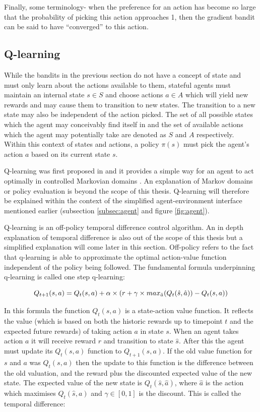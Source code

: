 Finally, some terminology- when the preference for an action has become so large that the probability of picking this action approaches 1, then the gradient bandit can be said to have “converged” to this action. 

\subsection{Q-learning}

While the bandits in the previous section do not have a concept of state and must only learn about the actions available to them, stateful agents must maintain an internal state $s \in S$ and choose actions $a \in A$ which will yield new rewards and may cause them to transition to new states. The transition to a new state may also be independent of the action picked. The set of all possible states which the agent may conceivably find itself in and the set of available actions which the agent may potentially take are denoted as $S$ and $A$ respectively. Within this context of states and actions, a policy $\pi(s)$ must pick the agent’s action $a$ based on its current state $s$.

Q-learning was first proposed in \cite{watkins_dayan} and it provides a simple way for an agent to act optimally in controlled Markovian domains \cite{watkins_dayan}. An explanation of Markov domains or policy evaluation is beyond the scope of this thesis. Q-learning will therefore be explained within the context of the simplified agent-environment interface mentioned earlier (subsection \ref{subsec:agent} and figure \ref{fig:agent}). 

Q-learning is an off-policy temporal  difference control algorithm. An in depth explanation of temporal difference is also out of the scope of this thesis but a simplified explanation will come later in this section. Off-policy refers to the fact that q-learning is able to approximate the optimal action-value function independent of the policy being followed. The fundamental formula underpinning q-learning is called one step q-learning:

\begin{equation}\label{eq:q-learning}
Q_{t+1}(s,a) = Q_t(s,a) + \alpha \times (r + \gamma \times max_{\hat{a}}(Q_t(\hat{s},\hat{a})) - Q_t(s,a) )\\
\end{equation}

In this formula the function $Q_t(s,a)$ is a state-action value function. It reflects the value (which is based on both the historic rewards up to timepoint $t$ and the expected future rewards) of taking action $a$ in state $s$. When an agent takes action $a$ it will receive reward $r$ and transition to state $\hat{s}$. After this the agent must update its $Q_t(s,a)$ function to $Q_{t+1}(s,a)$. If the old value function for $s$ and $a$ was $Q_t(s,a)$ then the update to this function is the difference between the old valuation, and the reward plus the discounted expected value of the new state. The expected value of the new state is $Q_t(\hat{s},\hat{a})$, where $\hat{a}$ is the action which maximises $Q_t(\hat{s},a)$ and $\gamma \in [0,1]$ is the discount. This is called the temporal difference:

